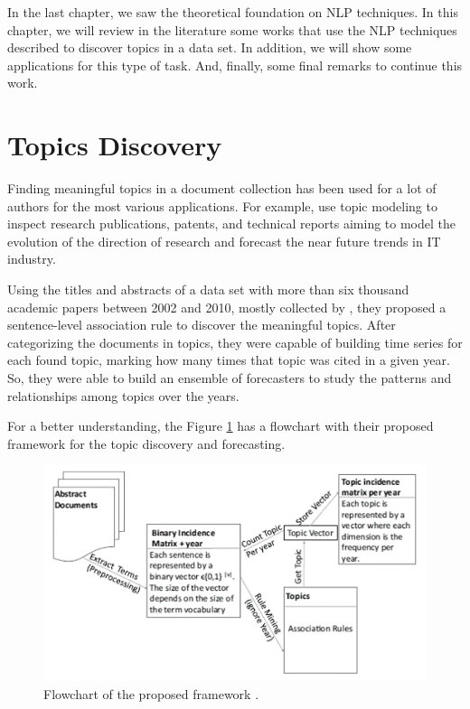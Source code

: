 In the last chapter, we saw the theoretical foundation on NLP techniques. In this chapter, we will review in the literature some works that use the NLP techniques described to discover topics in a data set. In addition, we will show some applications for this type of task. And, finally, some final remarks to continue this work.


\section{Topics Discovery}

Finding meaningful topics in a document collection has been used for a lot of authors for the most various applications. For example,  use topic modeling to inspect research publications, patents, and technical reports aiming to model the evolution of the direction of research and forecast the near future trends in IT industry.

Using the titles and abstracts of a data set with more than six thousand academic papers between 2002 and 2010, mostly collected by , they proposed a sentence-level association rule to discover the meaningful topics. After categorizing the documents in topics, they were capable of building time series for each found topic, marking how many times that topic was cited in a given year. So, they were able to build an ensemble of forecasters to study the patterns and relationships among topics over the years.

For a better understanding, the Figure \ref{fig:topic-discovery-framework} has a flowchart with their proposed framework for the topic discovery and forecasting.

\begin{figure}[h!]
	\centering
	\includegraphics[width=0.6\linewidth]{01.Chapters/03.RelatedWorks/topic-discovery-framework}
	\caption{Flowchart of the proposed framework \cite{hurtado2016topic}.}
	\label{fig:topic-discovery-framework}
\end{figure}

